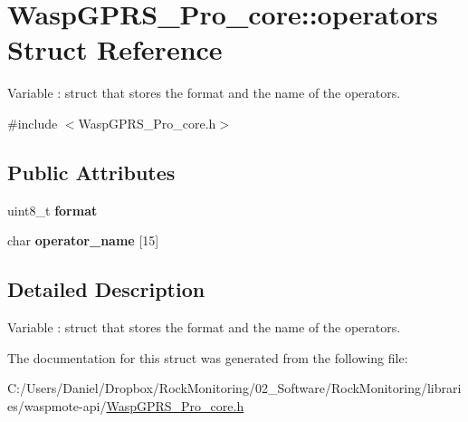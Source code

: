 \hypertarget{struct_wasp_g_p_r_s___pro__core_1_1operators}{}\section{Wasp\+G\+P\+R\+S\+\_\+\+Pro\+\_\+core\+:\+:operators Struct Reference}
\label{struct_wasp_g_p_r_s___pro__core_1_1operators}


Variable \+: struct that stores the format and the name of the operators.  




{\ttfamily \#include $<$Wasp\+G\+P\+R\+S\+\_\+\+Pro\+\_\+core.\+h$>$}

\subsection*{Public Attributes}
\begin{DoxyCompactItemize}
\item 
uint8\+\_\+t {\bfseries format}\hypertarget{struct_wasp_g_p_r_s___pro__core_1_1operators_aee68d791318443ab9c2be78438f6e8d1}{}\label{struct_wasp_g_p_r_s___pro__core_1_1operators_aee68d791318443ab9c2be78438f6e8d1}

\item 
char {\bfseries operator\+\_\+name} \mbox{[}15\mbox{]}\hypertarget{struct_wasp_g_p_r_s___pro__core_1_1operators_ab5af379e48182ce962a9bd8e69c611a9}{}\label{struct_wasp_g_p_r_s___pro__core_1_1operators_ab5af379e48182ce962a9bd8e69c611a9}

\end{DoxyCompactItemize}


\subsection{Detailed Description}
Variable \+: struct that stores the format and the name of the operators. 

The documentation for this struct was generated from the following file\+:\begin{DoxyCompactItemize}
\item 
C\+:/\+Users/\+Daniel/\+Dropbox/\+Rock\+Monitoring/02\+\_\+\+Software/\+Rock\+Monitoring/libraries/waspmote-\/api/\hyperlink{_wasp_g_p_r_s___pro__core_8h}{Wasp\+G\+P\+R\+S\+\_\+\+Pro\+\_\+core.\+h}\end{DoxyCompactItemize}
